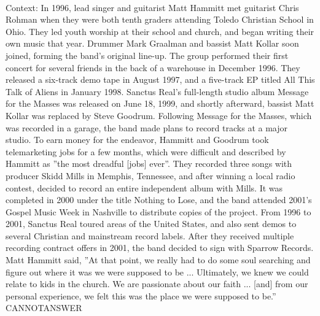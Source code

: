 \documentclass[11pt,a4paper, onecolumn]{article}
\begin{document}
\\ Context: In 1996, lead singer and guitarist Matt Hammitt met guitarist Chris Rohman when they were both tenth graders attending Toledo Christian School in Ohio. They led youth worship at their school and church, and began writing their own music that year. Drummer Mark Graalman and bassist Matt Kollar soon joined, forming the band's original line-up. The group performed their first concert for several friends in the back of a warehouse in December 1996. They released a six-track demo tape in August 1997, and a five-track EP titled All This Talk of Aliens in January 1998. Sanctus Real's full-length studio album Message for the Masses was released on June 18, 1999, and shortly afterward, bassist Matt Kollar was replaced by Steve Goodrum. Following Message for the Masses, which was recorded in a garage, the band made plans to record tracks at a major studio. To earn money for the endeavor, Hammitt and Goodrum took telemarketing jobs for a few months, which were difficult and described by Hammitt as ''the most dreadful [jobs] ever''. They recorded three songs with producer Skidd Mills in Memphis, Tennessee, and after winning a local radio contest, decided to record an entire independent album with Mills. It was completed in 2000 under the title Nothing to Lose, and the band attended 2001's Gospel Music Week in Nashville to distribute copies of the project. From 1996 to 2001, Sanctus Real toured areas of the United States, and also sent demos to several Christian and mainstream record labels. After they received multiple recording contract offers in 2001, the band decided to sign with Sparrow Records. Matt Hammitt said, ''At that point, we really had to do some soul searching and figure out where it was we were supposed to be ... Ultimately, we knew we could relate to kids in the church. We are passionate about our faith ... [and] from our personal experience, we felt this was the place we were supposed to be.'' CANNOTANSWER
\end{document}
